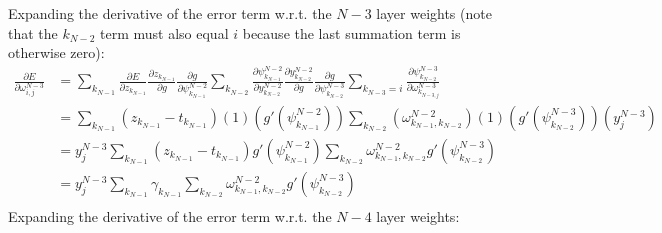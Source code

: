 \documentclass{article}
\begin{document}
%
Expanding the derivative of the error term w.r.t. the $N-3$ layer weights (note that the $k_{N-2}$ term must also equal $i$ because the last summation term is otherwise zero):
%
\begin{equation} \label{eq:derive_du_nm3}
\begin{aligned}
\frac{\partial E}{\partial \omega_{i,j}^{N-3}} &= 
%
\sum_{k_{N-1}}
\frac{\partial E}{\partial z_{k_{N-1}}}
\frac{\partial z_{k_{N-1}}}{\partial g}
\frac{\partial g}{\partial \psi_{k_{N-1}}^{N-2}}
%
\sum_{k_{N-2}}
\frac{\partial \psi_{k_{N-1}}^{N-2}}{\partial y_{k_{N-2}}^{N-2}}
\frac{\partial y_{k_{N-2}}^{N-2}}{\partial g}
\frac{\partial g}{\partial \psi_{k_{N-2}}^{N-3}}
%
\sum_{k_{N-3}=i}
\frac{\partial \psi_{k_{N-2}}^{N-3}}{\partial \omega_{k_{N-3,j}}^{N-3}} \\
& = \sum_{k_{N-1}}
\left( z_{k_{N-1}} - t_{k_{N-1}} \right)
%
(1)
\left( g' \left( \psi_{k_{N-1}}^{N-2} \right) \right)
%
\sum_{k_{N-2}}
\left( \omega_{k_{N-1},k_{N-2}}^{N-2} \right)
(1)
\left( g' (\psi_{k_{N-2}}^{N-3}) \right)
\left( y_j^{N-3} \right) \\
& = y_j^{N-3} \sum_{k_{N-1}}
\left(z_{k_{N-1}} - t_{k_{N-1}}\right)
%
g' \left(\psi_{k_{N-1}}^{N-2}\right)
%
\sum_{k_{N-2}}
\omega_{k_{N-1},k_{N-2}}^{N-2}
g' \left( \psi_{k_{N-2}}^{N-3} \right) \\
& = y_j^{N-3} \sum_{k_{N-1}}
\gamma_{k_{N-1}}
%
\sum_{k_{N-2}}
\omega_{k_{N-1},k_{N-2}}^{N-2}
g' \left( \psi_{k_{N-2}}^{N-3} \right) \\
\end{aligned}
\end{equation}
%
Expanding the derivative of the error term w.r.t. the $N-4$ layer weights:
%
\end{document}
